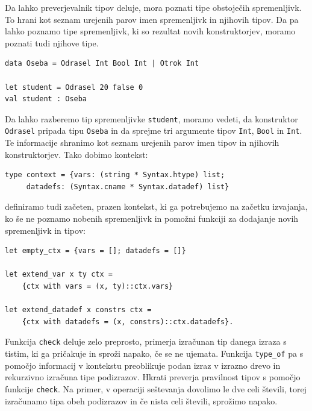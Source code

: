 \documentclass[a4paper,12pt,openright]{book}
\begin{document}
 Da lahko preverjevalnik tipov deluje, mora poznati tipe obstoječih spremenljivk. To hrani kot seznam urejenih parov imen spremenljivk in njihovih tipov. Da pa lahko poznamo tipe spremenljivk, 
 ki so rezultat novih konstruktorjev, moramo poznati tudi njihove tipe.
 \begin{lstlisting}
data Oseba = Odrasel Int Bool Int | Otrok Int

let student = Odrasel 20 false 0
val student : Oseba
\end{lstlisting}
Da lahko razberemo tip spremenljivke \lstinline{student}, moramo vedeti, da konstruktor \lstinline{Odrasel} pripada tipu \lstinline{Oseba} in da sprejme tri argumente tipov \lstinline{Int}, \lstinline{Bool} in \lstinline{Int}. Te informacije shranimo kot seznam urejenih parov imen 
tipov in njihovih konstruktorjev. Tako dobimo kontekst:
\begin{lstlisting}
type context = {vars: (string * Syntax.htype) list; 
     datadefs: (Syntax.cname * Syntax.datadef) list}
\end{lstlisting}
definiramo tudi začeten, prazen kontekst, ki ga potrebujemo na začetku izvajanja, ko še ne poznamo nobenih spremenljivk in pomožni funkciji za dodajanje novih spremenljivk in tipov:
\begin{lstlisting}
let empty_ctx = {vars = []; datadefs = []}

let extend_var x ty ctx = 
    {ctx with vars = (x, ty)::ctx.vars}

let extend_datadef x constrs ctx = 
    {ctx with datadefs = (x, constrs)::ctx.datadefs}.
\end{lstlisting}

Funkcija \lstinline{check} deluje zelo preprosto, primerja izračunan tip danega izraza s tistim, ki ga pričakuje in sproži napako, če se ne ujemata. Funkcija \lstinline{type_of} pa s pomočjo informacij 
v kontekstu preoblikuje podan izraz v izrazno drevo in rekurzivno izračuna tipe podizrazov. Hkrati preverja pravilnost tipov s pomočjo funkcije \lstinline{check}. Na primer, v operaciji seštevanja 
dovolimo le dve celi števili, torej izračunamo tipa obeh podizrazov in če nista celi števili, sprožimo napako.
\end{document}
